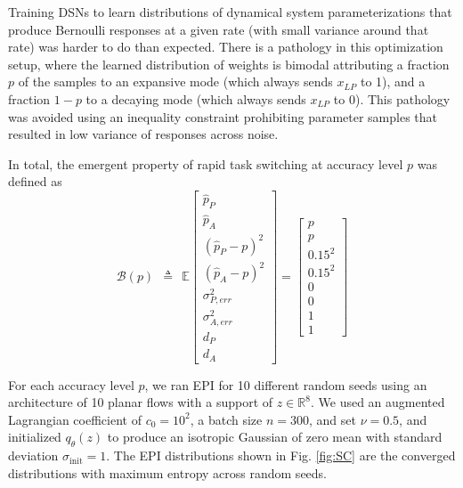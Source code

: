 \documentclass[11pt]{article}
\begin{document}
Training DSNs to learn distributions of dynamical system parameterizations that produce Bernoulli responses at a given rate (with small variance around that rate) was harder to do than expected.  There is a pathology in this optimization setup, where the learned distribution of weights is bimodal attributing a fraction $p$ of the samples to an expansive mode (which always sends $x_{LP}$ to 1), and a fraction $1-p$ to a decaying mode (which always sends $x_{LP}$ to 0).  This pathology was avoided using an inequality constraint prohibiting parameter samples that resulted in low variance of responses across noise.

In total, the emergent property of rapid task switching at accuracy level $p$ was defined as
\begin{equation}
\mathcal{B}(p) ~~\triangleq~~ \mathbb{E}\begin{bmatrix} \hat{p}_P \\ \hat{p}_A \\ (\hat{p}_P-p)^2 \\ (\hat{p}_A - p)^2 \\ \sigma^2_{P,err} \\ \sigma^2_{A,err} \\ d_P \\ d_A \end{bmatrix} = \begin{bmatrix} p \\ p \\ 0.15^2 \\ 0.15^2 \\ 0 \\ 0 \\ 1 \\ 1 \end{bmatrix}
\end{equation}

For each accuracy level $p$, we ran EPI for 10 different random seeds  using an architecture of 10 planar flows with a  support of $z \in \mathbb{R}^8$.   
We used an augmented Lagrangian coefficient of $c_0 = 10^2$, a batch size $n=300$, and set $\nu = 0.5$, and initialized $q_\theta(z)$ to produce an isotropic Gaussian of zero mean with standard deviation $\sigma_{\text{init}} = 1$.
The EPI distributions shown in Fig. \ref{fig:SC} are the converged distributions with maximum entropy across random seeds.
\end{document}
